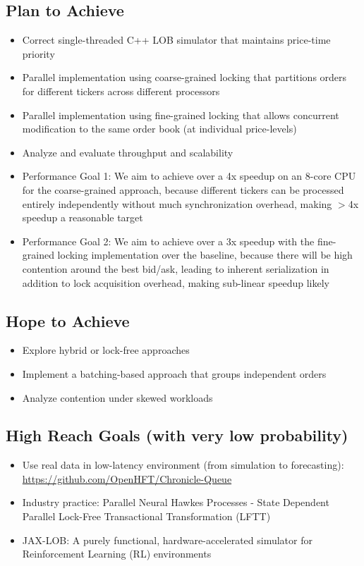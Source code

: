\documentclass[11pt]{article}
\begin{document}
\subsection*{Plan to Achieve}
\begin{itemize}
    \item Correct single-threaded C++ LOB simulator that maintains price-time priority
    \item Parallel implementation using coarse-grained locking that partitions orders for different tickers across different processors
    \item Parallel implementation using fine-grained locking that allows concurrent modification to the same order book (at individual price-levels)
    \item Analyze and evaluate throughput and scalability
    \item Performance Goal 1: We aim to achieve over a 4x speedup on an 8-core CPU for the coarse-grained approach, because different tickers can be processed entirely independently without much synchronization overhead, making $>$4x speedup a reasonable target
    \item Performance Goal 2: We aim to achieve over a 3x speedup with the fine-grained locking implementation over the baseline, because there will be high contention around the best bid/ask, leading to inherent serialization in addition to lock acquisition overhead, making sub-linear speedup likely
\end{itemize}

\subsection*{Hope to Achieve}
\begin{itemize}
    \item Explore hybrid or lock-free approaches
    \item Implement a batching-based approach that groups independent orders
    \item Analyze contention under skewed workloads
\end{itemize}

\subsection*{High Reach Goals (with very low probability)}
\begin{itemize}
    \item Use real data in low-latency environment (from simulation to forecasting): \url{https://github.com/OpenHFT/Chronicle-Queue}
    \item Industry practice: Parallel Neural Hawkes Processes - State Dependent Parallel Lock-Free Transactional Transformation (LFTT)
    \item JAX-LOB: A purely functional, hardware-accelerated simulator for Reinforcement Learning (RL) environments
\end{itemize}
\end{document}
